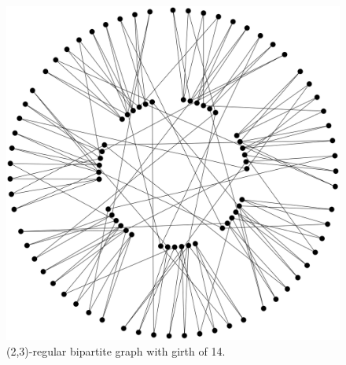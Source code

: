 \documentclass[14pt]{mmcs-article}
\begin{document}
\begin{figure}[H]
    \centering
    \includegraphics[scale=0.2]{graph_3.png}
    \caption{ (2,3)-regular bipartite graph with girth of 14. }
    \label{be_not_afraid_2}
\end{figure}
\end{document}
